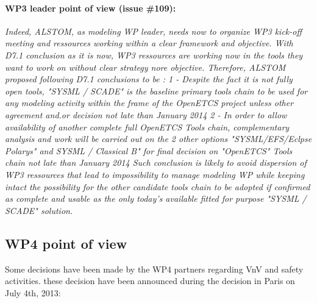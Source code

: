 \paragraph{WP3 leader point of view (issue \#109):}
\emph{Indeed, ALSTOM, as modeling WP leader, needs now to organize WP3 kick-off meeting and ressources working within a clear framework and objective. With D7.1 conclusion as it is now, WP3 ressources are working now in the tools they want to work on without clear strategy nore objective.
Therefore, ALSTOM proposed following D7.1 conclusions to be :
1 - Despite the fact it is not fully open tools, "SYSML / SCADE" is the baseline primary tools chain to be used for any modeling activity within the frame of the OpenETCS project unless other agreement and.or decision not late than January 2014
2 - In order to allow availability of another complete full OpenETCS Tools chain, complementary analysis and work will be carried out on the 2 other options "SYSML/EFS/Eclpse Polarys" and SYSML / Classical B" for final decision on "OpenETCS" Tools chain not late than January 2014
Such conclusion is likely to avoid dispersion of WP3 ressources that lead to impossibility to manage modeling WP while keeping intact the possibility for the other candidate tools chain to be adopted if confirmed as complete and usable as the only today's available fitted for purpose "SYSML / SCADE" solution.}


\subsection{WP4 point of view}

Some decisions have been made by the WP4 partners regarding VnV and safety activities. these decision have been announced during the decision in Paris on July 4th, 2013:




